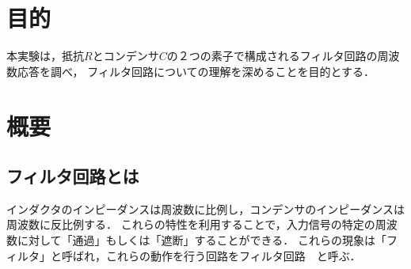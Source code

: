 \documentclass[a4paper,11pt]{jsarticle}
\begin{document}


\section{目的}
本実験は，抵抗$R$とコンデンサ$C$の２つの素子で構成されるフィルタ回路の周波数応答を調べ，
フィルタ回路についての理解を深めることを目的とする．

\section{概要}
\subsection{フィルタ回路とは}
インダクタのインピーダンスは周波数に比例し，コンデンサのインピーダンスは周波数に反比例する．
これらの特性を利用することで，入力信号の特定の周波数に対して「通過」もしくは「遮断」することができる．
これらの現象は「フィルタ」と呼ばれ，これらの動作を行う回路をフィルタ回路~\cite{text}~\cite{filtar}と呼ぶ．
\end{document}
